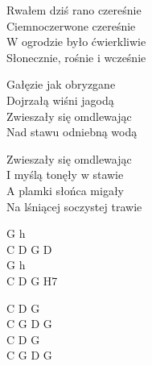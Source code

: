\begin{text}
    Rwałem dziś rano czereśnie\\
    Ciemnoczerwone czereśnie\\
    W ogrodzie było ćwierkliwie\\
    Słonecznie, rośnie i wcześnie

    Gałęzie jak obryzgane\\
    Dojrzałą wiśni jagodą\\
    Zwieszały się omdlewając\\
    Nad stawu odniebną wodą

    Zwieszały się omdlewając\\
    I myślą tonęły w stawie\\
    A plamki słońca migały\\
    Na lśniącej soczystej trawie
\end{text}
\begin{chord}
    G h\\
    C D G D\\
    G h\\
    C D G H7

    C D G\\
    C G D G\\
    C D G\\
    C G D G
\end{chord}